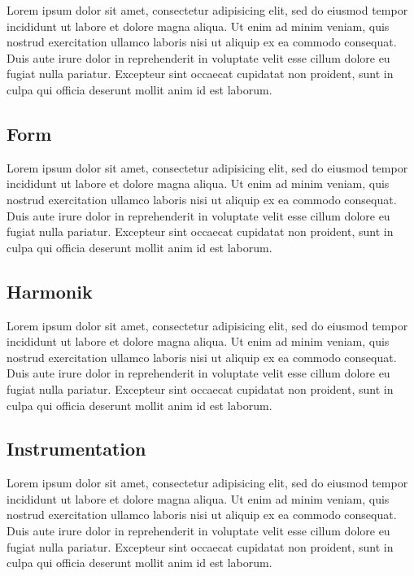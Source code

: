Lorem ipsum dolor sit amet, consectetur adipisicing elit, sed do eiusmod tempor incididunt ut labore et dolore magna aliqua. Ut enim ad minim veniam, quis nostrud exercitation ullamco laboris nisi ut aliquip ex ea commodo consequat. Duis aute irure dolor in reprehenderit in voluptate velit esse cillum dolore eu fugiat nulla pariatur. Excepteur sint occaecat cupidatat non proident, sunt in culpa qui officia deserunt mollit anim id est laborum.


\subsection{Form}

Lorem ipsum dolor sit amet, consectetur adipisicing elit, sed do eiusmod tempor incididunt ut labore et dolore magna aliqua. Ut enim ad minim veniam, quis nostrud exercitation ullamco laboris nisi ut aliquip ex ea commodo consequat. Duis aute irure dolor in reprehenderit in voluptate velit esse cillum dolore eu fugiat nulla pariatur. Excepteur sint occaecat cupidatat non proident, sunt in culpa qui officia deserunt mollit anim id est laborum.


\subsection{Harmonik}

Lorem ipsum dolor sit amet, consectetur adipisicing elit, sed do eiusmod tempor incididunt ut labore et dolore magna aliqua. Ut enim ad minim veniam, quis nostrud exercitation ullamco laboris nisi ut aliquip ex ea commodo consequat. Duis aute irure dolor in reprehenderit in voluptate velit esse cillum dolore eu fugiat nulla pariatur. Excepteur sint occaecat cupidatat non proident, sunt in culpa qui officia deserunt mollit anim id est laborum.



\subsection{Instrumentation}

Lorem ipsum dolor sit amet, consectetur adipisicing elit, sed do eiusmod tempor incididunt ut labore et dolore magna aliqua. Ut enim ad minim veniam, quis nostrud exercitation ullamco laboris nisi ut aliquip ex ea commodo consequat. Duis aute irure dolor in reprehenderit in voluptate velit esse cillum dolore eu fugiat nulla pariatur. Excepteur sint occaecat cupidatat non proident, sunt in culpa qui officia deserunt mollit anim id est laborum.
